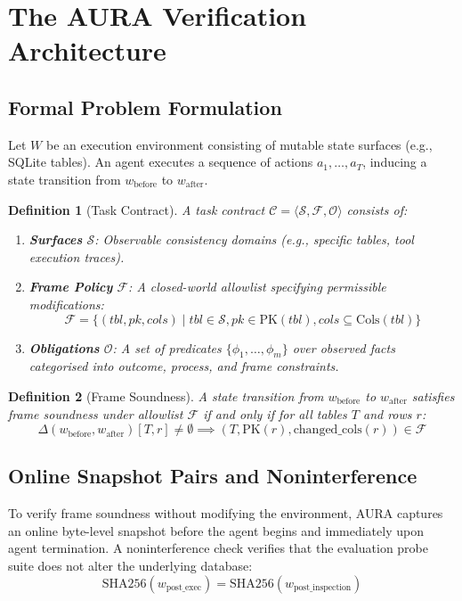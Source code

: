\documentclass[11pt,a4paper]{article}
\newtheorem{definition}{Definition}
\newcommand{\aura}{\textsc{AURA}}
\begin{document}
\section{The AURA Verification Architecture}

\subsection{Formal Problem Formulation}
Let $W$ be an execution environment consisting of mutable state surfaces (e.g., SQLite tables). An agent executes a sequence of actions $a_1, \dots, a_T$, inducing a state transition from $w_{\text{before}}$ to $w_{\text{after}}$.

\begin{definition}[Task Contract]
A task contract $\mathcal{C} = \langle \mathcal{S}, \mathcal{F}, \mathcal{O} \rangle$ consists of:
\begin{enumerate}
    \item \textbf{Surfaces} $\mathcal{S}$: Observable consistency domains (e.g., specific tables, tool execution traces).
    \item \textbf{Frame Policy} $\mathcal{F}$: A closed-world allowlist specifying permissible modifications:
    $$\mathcal{F} = \{ (tbl, pk, cols) \mid tbl \in \mathcal{S}, pk \in \text{PK}(tbl), cols \subseteq \text{Cols}(tbl) \}$$
    \item \textbf{Obligations} $\mathcal{O}$: A set of predicates $\{ \phi_1, \dots, \phi_m \}$ over observed facts categorised into \emph{outcome}, \emph{process}, and \emph{frame} constraints.
\end{enumerate}
\end{definition}

\begin{definition}[Frame Soundness]
A state transition from $w_{\text{before}}$ to $w_{\text{after}}$ satisfies frame soundness under allowlist $\mathcal{F}$ if and only if for all tables $T$ and rows $r$:
$$\Delta(w_{\text{before}}, w_{\text{after}})[T, r] \neq \emptyset \implies (T, \text{PK}(r), \text{changed\_cols}(r)) \in \mathcal{F}$$
\end{definition}

\subsection{Online Snapshot Pairs and Noninterference}
To verify frame soundness without modifying the environment, \aura{} captures an online byte-level snapshot before the agent begins and immediately upon agent termination. A noninterference check verifies that the evaluation probe suite does not alter the underlying database:
$$\text{SHA256}(w_{\text{post\_exec}}) = \text{SHA256}(w_{\text{post\_inspection}})$$
\end{document}
